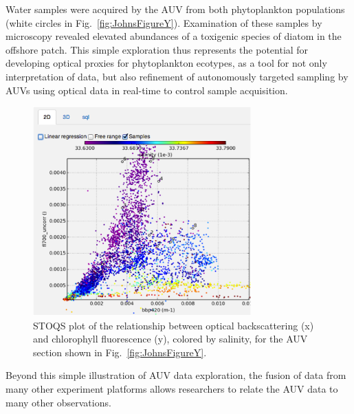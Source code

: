 Water samples were acquired by the AUV from both phytoplankton populations (white circles in Fig.~\ref{fig:JohnsFigureY}).  Examination of these samples by microscopy revealed elevated abundances of a toxigenic species of diatom in the offshore patch.  This simple exploration thus represents the potential for developing optical proxies for phytoplankton ecotypes, as a tool for not only interpretation of data, but also refinement of autonomously targeted sampling by AUVs using optical data in real-time to control sample acquisition.

\begin{figure}[htbp]
\centering
\includegraphics[width=3.3in]{JohnsFigureZ.png}
\caption{STOQS plot of the relationship between optical backscattering (x) and chlorophyll fluorescence (y), colored by salinity, for the AUV section shown in Fig.~\ref{fig:JohnsFigureY}.}
\label{fig:JohnsFigureZ}
\end{figure}

Beyond this simple illustration of AUV data exploration, the fusion of data from many other experiment platforms allows researchers to relate the AUV data to many other observations.

